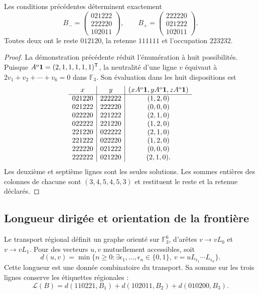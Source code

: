 \begin{theorem}
\label{r36c:thm:dos} Les conditions précédentes déterminent exactement
\[
B_- =\begin{pmatrix}021222\\222220\\102011\end{pmatrix},
\qquad
B_+ =\begin{pmatrix}222220\\021222\\102011\end{pmatrix}.
\]
Toutes deux ont le reste $012120$, la retenue $111111$ et l’occupation $223232$.
\end{theorem}
\begin{proof}
La démonstration précédente réduit l’énumération à huit possibilités. Puisque $A^{\rm o}\mathbf1=(2,1,1,1,1,1)^{\mathsf T}$, la neutralité d’une ligne $v$ équivaut à $2v_1+v_2+\cdots+v_6=0$ dans $\mathbb F_3$. Son évaluation dans les huit dispositions est
\[
\begin{array}{c|c|c}
x&y&(xA^{\rm o}\mathbf1,yA^{\rm o}\mathbf1,zA^{\rm o}\mathbf1)\\\hline
021220&222222&(1,2,0)\\
021222&222220&(0,0,0)\\
022220&221222&(2,1,0)\\
022222&221220&(1,2,0)\\
221220&022222&(2,1,0)\\
221222&022220&(1,2,0)\\
222220&021222&(0,0,0)\\
222222&021220&(2,1,0).
\end{array}
\]
Les deuxième et septième lignes sont les seules solutions. Les sommes entières des colonnes de chacune sont $(3,4,5,4,5,3)$ et restituent le reste et la retenue déclarés.
\end{proof}

\subsection{Longueur dirigée et orientation de la frontière}

Le transport régional définit un graphe orienté sur $\mathbb F_3^6$, d’arêtes $v\to vL_0$ et $v\to vL_1$. Pour des vecteurs $u,v$ mutuellement accessibles, soit
\[
d(u,v)=\min\{n\ge0:\exists\epsilon_1,\ldots,\epsilon_n\in\{0,1\},
\ v=uL_{\epsilon_1}\cdots L_{\epsilon_n}\}.
\]
Cette longueur est une donnée combinatoire du transport. Sa somme sur les trois lignes conserve les étiquettes régionales :
\[
\mathcal L(B)=d(110221,B_1)+d(102011,B_2)+d(010200,B_3).
\]

